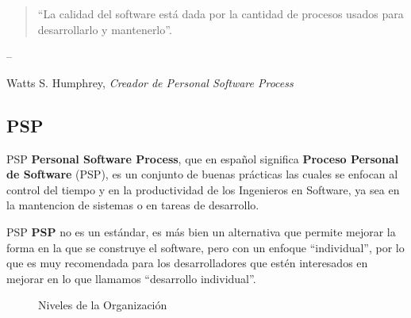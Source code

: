 \documentclass[]{beamer}
\begin{document}
				\begin{frame}
					\begin{quotation}``La calidad del software está dada por la cantidad de procesos usados para desarrollarlo y mantenerlo''.\end{quotation}
			
				\hfill -- \parbox[t]{.9\textwidth}{Watts S. Humphrey,
				\textit{Creador de Personal Software Process}}

				\end{frame}
		
		\subsection{PSP}
			\begin{frame}{PSP}
				\textbf{Personal Software Process}, que en español significa \textbf{Proceso Personal de Software} (PSP), es un conjunto de buenas pr\'acticas las cuales se enfocan al control del tiempo y en la productividad de los Ingenieros en Software, ya sea en la mantencion de sistemas o en tareas de desarrollo.
			\end{frame}
			
			\begin{frame}{PSP}
				\textbf{PSP} no es un est\'andar, es m\'as bien un alternativa que permite mejorar la forma en la que se construye el software, pero con un enfoque ``individual'', por lo que es muy recomendada para los desarrolladores que estén interesados en mejorar en lo que llamamos ``desarrollo individual''.
				\begin{figure}
    				 \caption{Niveles de la Organización}
				\end{figure}
			\end{frame}
				
\end{document}
